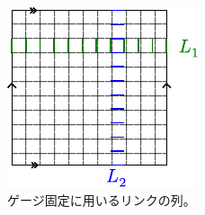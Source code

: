 \documentclass[report,paper=a4, fontsize=12pt, line_length=16cm, number_of_lines=33,dvipdfmx]{jlreq}
\numberwithin{equation}{chapter}
\begin{document}
\begin{figure}
  \centering
  \includegraphics{gaugefix.pdf}
  \caption{ゲージ固定に用いるリンクの列。}
  \label{fig:gaugefix}
\end{figure}


\newcommand{\torusoo}{
  \ 
  \begin{tikzpicture}[baseline=0.4cm]
    \draw (0,0) rectangle (1,1);   
  \end{tikzpicture}
  \ 
}

\newcommand{\torusio}{
  \ 
  \begin{tikzpicture}[baseline=0.4cm]
    \draw (0,0) rectangle (1,1);   
    \draw[thick,red] (0,0.7)--(1,0.7); 
  \end{tikzpicture}
  \ 
}

\newcommand{\torusoi}{
  \ 
  \begin{tikzpicture}[baseline=0.4cm]
    \draw (0,0) rectangle (1,1);   
    \draw[thick,red] (0.7,0)--(0.7,1); 
  \end{tikzpicture}
  \ 
}

\newcommand{\torusii}{
  \ 
  \begin{tikzpicture}[baseline=0.4cm]
    \draw (0,0) rectangle (1,1);   
    \draw[thick,red] (0,0.7)--(1,0.7); 
    \draw[thick,red] (0.7,0)--(0.7,1); 
  \end{tikzpicture}
  \ 
}
\end{document}
